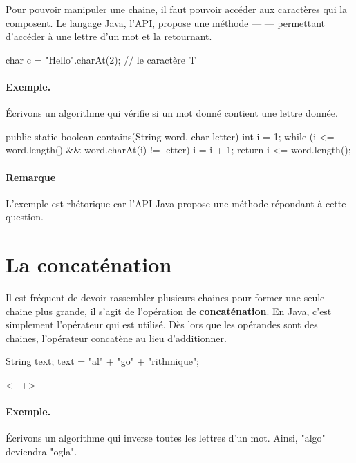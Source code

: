 	Pour pouvoir manipuler une chaine, il faut pouvoir accéder aux caractères
	qui la composent.  
	Le langage Java, l'API, propose une méthode — 
	—  permettant d'accéder à une lettre d'un mot et la retournant. 
	
	\begin{java}
char c = "Hello".charAt(2);		// le caractère 'l'
	\end{java}

	\paragraph{Exemple.}
	Écrivons un algorithme qui vérifie si un mot donné
	contient une lettre donnée.
	
	\begin{java}
public static boolean contains(String word, char letter){
	int i = 1;
	while (i <= word.length() && word.charAt(i) != letter){
		i = i + 1;
	}
	return i <= word.length();
}	
	\end{java}

	\paragraph{Remarque}

	L'exemple est rhétorique car l'API Java propose une méthode 
	répondant à cette question.  



\section{La concaténation}

	Il est fréquent de devoir rassembler plusieurs chaines pour former une
	seule chaine plus grande, il s’agit de l’opération de
	\textbf{concaténation}. En Java, c'est simplement l'opérateur \pc{+} qui
	est utilisé. Dès lors que les opérandes sont des chaines, l'opérateur
	concatène au lieu d'additionner. 
	
\begin{java}
String text;
text = "al" + "go" + "rithmique";
\end{java}<++>
	
	\paragraph{Exemple.}
	Écrivons un algorithme qui inverse toutes les lettres d’un mot.
	Ainsi, "algo" deviendra "ogla".
	
